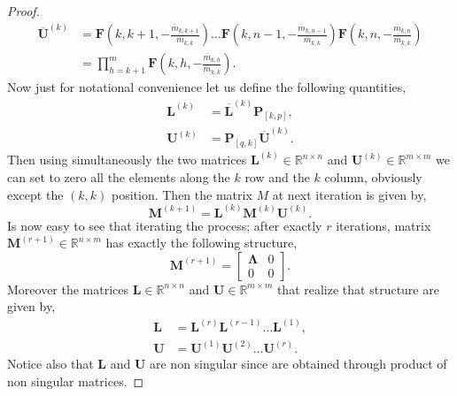 \begin{proof}
\begin{equation}
				\begin{split}
					\overline{\bm{U}}^{(k)} &= 
					\bm{F}\left(k,k+1,-\frac{\overline{m}_{k,k+1}}{\overline{m}_{k,k}}\right)
					\dots \bm{F}\left(k,n-1,-\frac{\overline{m}_{k,n-1}}{\overline{m}_{k,k}}\right)\bm{F}
					\left(k,n,-\frac{\overline{m}_{k,n}}{\overline{m}_{k,k}}\right) \\
					&= \prod_{h=k+1}^{m} \bm{F}\left(k,h,-\frac{\overline{m}_{k,h}}{\overline{m}_{k,k}}\right).
				\end{split}
			\end{equation}
			Now just for notational convenience  let us define the following quantities,
			\begin{subequations}
				\begin{align}
					\bm{L}^{(k)} &= \overline{\bm{L}}^{(k)}\bm{P}_{[k,p]}, \\
					\bm{U}^{(k)} &= \bm{P}_{[q,k]}\overline{\bm{U}}^{(k)}.
				\end{align}
			\end{subequations}
			Then using simultaneously the two matrices $\bm{L}^{(k)}\in\mathbb{R}^{n\times n}$ 
			and $\bm{U}^{(k)}\in\mathbb{R}^{m\times m}$ we can set to zero all the elements 
			along the $k$ row and the $k$ column, obviously except the $(k,k)$ position.
			Then the matrix $M$ at next iteration is given by,
			\begin{equation}
				\bm{M}^{(k+1)} = \bm{L}^{(k)}\bm{M}^{(k)}\bm{U}^{(k)}.
			\end{equation}
			Is now easy to see that iterating the process; after exactly $r$ iterations,
			matrix $\bm{M}^{(r+1)}\in\mathbb{R}^{n\times m}$ has exactly the following structure,
			\begin{equation}
				\bm{M}^{(r+1)} = 
				\begin{bmatrix}
					\bm{\Lambda} & 0 \\
					0 		& 0 
				\end{bmatrix}.
			\end{equation}
			Moreover the matrices $\bm{L}\in\mathbb{R}^{n\times n}$ and $\bm{U}\in\mathbb{R}^{m\times m}$ 
			that realize that structure are given by, 
			\begin{subequations}
				\begin{align}
					\bm{L} &= \bm{L}^{(r)}\bm{L}^{(r-1)}\dots\bm{L}^{(1)}, \\
					\bm{U} &= \bm{U}^{(1)}\bm{U}^{(2)}\dots \bm{U}^{(r)}.
				\end{align}
			\end{subequations}
			Notice also that $\bm{L}$ and $\bm{U}$ are non singular since are
			obtained through product of non singular matrices. 
		\end{proof}
